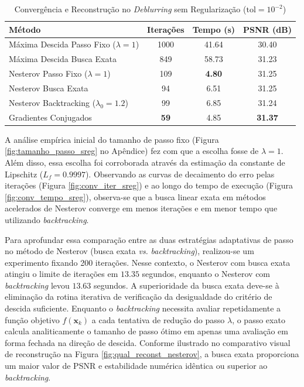 \documentclass[12pt]{article}
\begin{document}
\begin{table}[H]
    \centering
    \caption{Convergência e Reconstrução no \textit{Deblurring} sem Regularização ($\text{tol}=10^{-2}$)}
    \label{tab:resultados}
    \begin{tabular}{lccc}
        \toprule
        \textbf{Método} & \textbf{Iterações} & \textbf{Tempo (s)} & \textbf{PSNR (dB)} \\
        \midrule
        Máxima Descida Passo Fixo ($\lambda=1$) & 1000 & 41.64 & 30.40 \\
        Máxima Descida Busca Exata & 849 & 58.73 & 31.23 \\
        Nesterov Passo Fixo ($\lambda=1$) & 109 & \textbf{4.80} & 31.25 \\
        Nesterov Busca Exata & 94 & 6.51 & 31.25 \\
        Nesterov Backtracking ($\lambda_0=1.2$) & 99 & 6.85 & 31.24 \\
        Gradientes Conjugados & \textbf{59} & 4.85 & \textbf{31.37} \\
        \bottomrule
    \end{tabular}
\end{table}

A análise empírica inicial do tamanho de passo fixo (Figura \ref{fig:tamanho_passo_sreg} no Apêndice) fez com que a escolha fosse de $\lambda = 1$. Além disso, essa escolha foi corroborada através da estimação da constante de Lipschitz ($L_f = 0.9997$). Observando as curvas de decaimento do erro pelas iterações (Figura \ref{fig:conv_iter_sreg}) e ao longo do tempo de execução (Figura \ref{fig:conv_tempo_sreg}), observa-se que a busca linear exata em métodos acelerados de Nesterov converge em menos iterações e em menor tempo que utilizando \textit{backtracking}.

Para aprofundar essa comparação entre as duas estratégias adaptativas de passo no método de Nesterov (busca exata \textit{vs.} \textit{backtracking}), realizou-se um experimento fixando 200 iterações. Nesse contexto, o Nesterov com busca exata atingiu o limite de iterações em $13.35$ segundos, enquanto o Nesterov com \textit{backtracking} levou $13.63$ segundos. A superioridade da busca exata deve-se à eliminação da rotina iterativa de verificação da desigualdade do critério de descida suficiente. Enquanto o \textit{backtracking} necessita avaliar repetidamente a função objetivo $f(\mathbf{x}_k)$ a cada tentativa de redução do passo $\lambda$, o passo exato calcula analiticamente o tamanho de passo ótimo em apenas uma avaliação em forma fechada na direção de descida. Conforme ilustrado no comparativo visual de reconstrução na Figura \ref{fig:qual_reconst_nesterov}, a busca exata proporciona um maior valor de PSNR e estabilidade numérica idêntica ou superior ao \textit{backtracking}.
\end{document}
